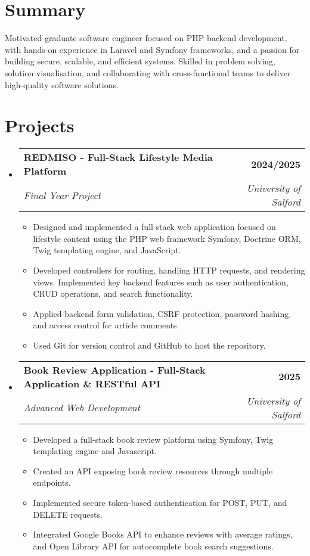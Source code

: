 \documentclass[a4paper,12pt]{article}
\makeatletter
\newcommand{\resumeSubHeadingListStart}{\begin{itemize}[leftmargin=0in, label={}]}
\newcommand{\resumeSubHeadingListEnd}{\end{itemize}}
\newcommand{\resumeSubheading}[4]{
  \item
    \begin{tabular*}{\textwidth}[t]{l@{\extracolsep{\fill}}r}
      \textbf{#1} & #2 \\
      \textit{#3} & \textit{#4} \\
    \end{tabular*}\vspace{-2pt}
}
\newcommand{\resumeItem}[1]{\item #1}
\newcommand{\resumeItemListStart}{\begin{itemize}[leftmargin=2em, label=\textbullet, itemsep=2pt]}
\newcommand{\resumeItemListEnd}{\end{itemize}}
\makeatother
\begin{document}
\section{Summary}
Motivated graduate software engineer focused on PHP backend development, with hands-on experience in Laravel and Symfony frameworks, and a passion for building secure, scalable, and efficient systems. Skilled in problem solving, solution visualisation, and collaborating with cross-functional teams to deliver high-quality software solutions.

\section{Projects}

\resumeSubHeadingListStart
    \resumeSubheading
    {REDMISO - Full-Stack Lifestyle Media Platform}{\bfseries{2024/2025}}
    {Final Year Project}{University of Salford}
        \resumeItemListStart
            \resumeItem{Designed and implemented a full-stack web application focused on lifestyle content using the PHP web framework Symfony, Doctrine ORM, Twig templating engine, and JavaScript.}
            \resumeItem{Developed controllers for routing, handling HTTP requests, and rendering views. Implemented key backend features such as user authentication, CRUD operations, and search functionality.}
            \resumeItem{Applied backend form validation, CSRF protection, password hashing, and access control for article comments.}
            \resumeItem{Used Git for version control and GitHub to host the repository.}
        \resumeItemListEnd
\resumeSubHeadingListEnd

\resumeSubHeadingListStart
    \resumeSubheading
    {Book Review Application - Full-Stack Application \& RESTful API}{\bfseries{2025}}
    {Advanced Web Development}{University of Salford}
        \resumeItemListStart
            \resumeItem{Developed a full-stack book review platform using Symfony, Twig templating engine and Javascript.}
            \resumeItem{Created an API exposing book review resources through multiple endpoints.}
            \resumeItem{Implemented secure token-based authentication for POST, PUT, and DELETE requests.}
            \resumeItem{Integrated Google Books API to enhance reviews with average ratings, and Open Library API for autocomplete book search suggestions.}
        \resumeItemListEnd
\resumeSubHeadingListEnd

\end{document}
